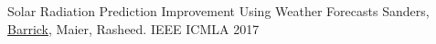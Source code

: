 
\begin{cvhonors}

\cvhonor
{Solar Radiation Prediction Improvement Using Weather Forecasts}
{Sanders, \underline{Barrick}, Maier, Rasheed.}
{IEEE ICMLA}
{2017}

\end{cvhonors}


%
%
%
%

